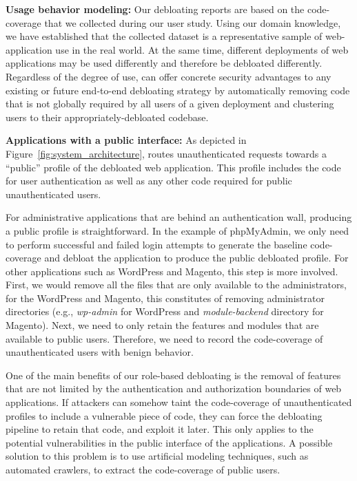 \noindent\textbf{Usage behavior modeling: }
Our debloating reports are based on the code-coverage that we collected during our user study. Using our domain knowledge, we have established that the collected dataset is a representative sample of web-application use in the real world. At the same time, different deployments of web applications may be used differently and therefore be debloated differently. Regardless of the degree of use, \dbltr{} can offer concrete security advantages to any existing or future end-to-end debloating strategy by automatically removing code that is not globally required by all users of a given deployment and clustering users to their appropriately-debloated codebase.

\noindent\textbf{Applications with a public interface: }
As depicted in Figure~\ref{fig:system_architecture}, \dbltr{} routes unauthenticated requests towards a ``public'' profile of the debloated web application. 
This profile includes the code for user authentication as well as any other code required for public unauthenticated users. 

For administrative applications that are behind an authentication wall, producing a public profile is straightforward. 
In the example of phpMyAdmin, we only need to perform successful and failed login attempts to generate the baseline code-coverage and debloat the application to produce the public debloated profile. 
For other applications such as WordPress and Magento, this step is more involved. 
First, we would remove all the files that are only available to the administrators, for the WordPress and Magento, this constitutes of removing administrator directories (e.g., \emph{wp-admin} for WordPress and \emph{module-backend} directory for Magento).
Next, we need to only retain the features and modules that are available to public users. 
Therefore, we need to record the code-coverage of unauthenticated users with benign behavior. 

One of the main benefits of our role-based debloating is the removal of features that are not limited by the authentication and authorization boundaries of web applications. 
If attackers can somehow taint the code-coverage of unauthenticated profiles to include a vulnerable piece of code, they can force the debloating pipeline to retain that code, and exploit it later. This only applies to the potential vulnerabilities in the public interface of the applications. 
A possible solution to this problem is to use artificial modeling techniques, such as automated crawlers, to extract the code-coverage of public users. 

